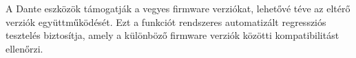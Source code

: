 A Dante eszközök támogatják a vegyes firmware verziókat, lehetővé téve az eltérő 
verziók együttműködését. Ezt a funkciót rendszeres automatizált regressziós tesztelés 
biztosítja, amely a különböző firmware verziók közötti kompatibilitást ellenőrzi.

